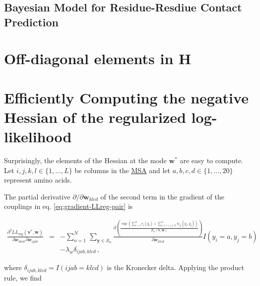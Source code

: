 \documentclass[12pt,a4paper,twoside]{book}
\newcommand{\eq}{\!=\!}
\renewcommand{\H}{\mathbf{H}}
\newcommand{\LLreg}{L\!L_\mathrm{reg}}
\newcommand{\Sn}{\mathcal{S}_n}
\renewcommand{\v}{\mathbf{v}}
\newcommand{\w}{\mathbf{w}}
\newcommand{\wijab}{\mathcal{w}_{ijab}}
\newcommand{\wklcd}{\mathcal{w}_{klcd}}
\theoremstyle{definition}
\theoremstyle{definition}
\theoremstyle{remark}
\begin{document}
\subsection{Bayesian Model for Residue-Resdiue Contact
Prediction}\label{bayesian-model-for-residue-resdiue-contact-prediction}

\section{\texorpdfstring{Off-diagonal elements in
\(\H\)}{Off-diagonal elements in \textbackslash{}H}}\label{Hessian-offdiagonal}

\section{Efficiently Computing the negative Hessian of the regularized
log-likelihood}\label{neg-Hessian-computation}

Surprisingly, the elements of the Hessian at the mode \(\w^*\) are easy
to compute. Let \(i,j,k,l \in \{1,\ldots,L\}\) be columns in the
\protect\hyperlink{abbrev}{MSA} and let
\(a, b, c, d \in \{1,\ldots,20\}\) represent amino acids.

The partial derivative \(\partial / \partial \w_{klcd}\) of the second
term in the gradient of the couplings in eq.
\eqref{eq:gradient-LLreg-pair} is

\begin{eqnarray}
    \frac{\partial^2 \LLreg(\v^*,\w)}{\partial \wklcd \, \partial \wijab } 
    &=&  - \sum_{n=1}^{N} \, \sum_{\mathbf{y} \in \Sn} \frac{\partial \left( \frac{\exp \left( \sum_{i=1}^L v_i(y_i) + \sum_{1 \le i < j \le L}^L w_{ij}(y_i,y_j) \right) }{Z_n(\v,\w)} \right)}{\partial \wklcd}   I(y_i \eq a, y_j \eq b) \\
    &&- \lambda_w \delta_{ijab,klcd} \,,
\end{eqnarray}

where \(\delta_{ijab,klcd} = I(ijab=klcd)\) is the Kronecker delta.
Applying the product rule, we find
\end{document}
